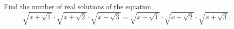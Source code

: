 Find the number of real solutions of the equation \[\sqrt{x+\sqrt{1}}\cdot\sqrt{x+\sqrt{2}}\cdot\sqrt{x-\sqrt{3}}=\sqrt{x-\sqrt{1}}\cdot\sqrt{x-\sqrt{2}}\cdot\sqrt{x+\sqrt{3}}.\]

